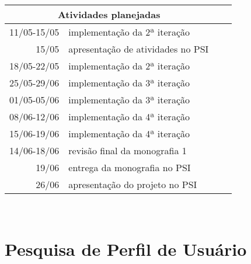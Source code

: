 \documentclass[a4paper,12pt,font=plain,header=plain]{abnt}
\begin{document}
	\begin{tabularx}{0.9\linewidth}[|l|]{ |r|X|l|X| }
	\hline
		\multicolumn{2}{|c|}{\textbf{Atividades planejadas}} \\
	\hline
		11/05-15/05 & implementação da 2ª iteração \\
	\hline
		15/05 & apresentação de atividades no PSI \\
	\hline
		18/05-22/05 & implementação da 2ª iteração \\
	\hline
		25/05-29/06 & implementação da 3ª iteração \\
	\hline
		01/05-05/06 & implementação da 3ª iteração \\
	\hline
		08/06-12/06 & implementação da 4ª iteração \\
	\hline
		15/06-19/06 & implementação da 4ª iteração \\
	\hline
		14/06-18/06 & revisão final da monografia 1 \\
	\hline
		19/06 & entrega da monografia no PSI \\
	\hline
		26/06 & apresentação do projeto no PSI \\
	\hline
	\end{tabularx} \\



\apendice
\chapter{Pesquisa de Perfil de Usuário}
  
\end{document}
